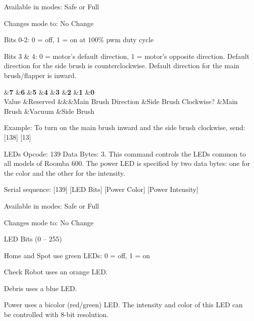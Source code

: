\begin{Desc}
\begin{description}
\begin{DoxyItemize}
\item Available in modes\+: Safe or Full
\item Changes mode to\+: No Change
\item Bits 0-\/2\+: 0 = off, 1 = on at 100\% pwm duty cycle
\item Bits 3 \& 4\+: 0 = motor’s default direction, 1 = motor’s opposite direction. Default direction for the side brush is counterclockwise. Default direction for the main brush/flapper is inward. \begin{TabularC}{9}
\hline
{}&{\bf 7 }&{\bf 6 }&{\bf 5 }&{\bf 4 }&{\bf 3 }&{\bf 2 }&{\bf 1 }&{\bf 0  }\\
Value &Reserved &&&Main Brush Direction &Side Brush Clockwise? &Main Brush &Vacuum &Side Brush \\
\end{TabularC}
Example\+: To turn on the main brush inward and the side brush clockwise, send\+: \mbox{[}138\mbox{]} \mbox{[}13\mbox{]} 
\end{DoxyItemize}\item[{\em 
\hypertarget{group__roomba-lib_gga305e17dfb7050ad83ea49ded2e6a2e24ae4122f32b1c10a1b6f8606da15522599}{}R\+O\+O\+M\+B\+A\+\_\+\+L\+E\+D\+S\label{group__roomba-lib_gga305e17dfb7050ad83ea49ded2e6a2e24ae4122f32b1c10a1b6f8606da15522599}
}]L\+E\+Ds Opcode\+: 139 Data Bytes\+: 3. This command controls the L\+E\+Ds common to all models of Roomba 600. The power L\+E\+D is specified by two data bytes\+: one for the color and the other for the intensity.
\begin{DoxyItemize}
\item Serial sequence\+: \mbox{[}139\mbox{]} \mbox{[}L\+E\+D Bits\mbox{]} \mbox{[}Power Color\mbox{]} \mbox{[}Power Intensity\mbox{]}
\item Available in modes\+: Safe or Full
\item Changes mode to\+: No Change
\item L\+E\+D Bits (0 – 255)
\begin{DoxyItemize}
\item Home and Spot use green L\+E\+Ds\+: 0 = off, 1 = on
\item Check Robot uses an orange L\+E\+D.
\item Debris uses a blue L\+E\+D.
\item Power uses a bicolor (red/green) L\+E\+D. The intensity and color of this L\+E\+D can be controlled with 8-\/bit resolution.
\end{DoxyItemize}
\end{DoxyItemize}


\end{description}
\end{Desc}
